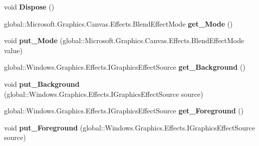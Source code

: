 \begin{DoxyCompactItemize}
\item 
\mbox{\label{class_microsoft_1_1_graphics_1_1_canvas_1_1_effects_1_1_blend_effect_a5d0e95366e1252da3cf90f1d61cd0935}} 
void {\bfseries Dispose} ()
\item 
\mbox{\label{class_microsoft_1_1_graphics_1_1_canvas_1_1_effects_1_1_blend_effect_ab50bbe9eaad5189343a4e0dc8958294a}} 
global\+::\+Microsoft.\+Graphics.\+Canvas.\+Effects.\+Blend\+Effect\+Mode {\bfseries get\+\_\+\+Mode} ()
\item 
\mbox{\label{class_microsoft_1_1_graphics_1_1_canvas_1_1_effects_1_1_blend_effect_ae28d797f3ec0b639d357346a4e2eb258}} 
void {\bfseries put\+\_\+\+Mode} (global\+::\+Microsoft.\+Graphics.\+Canvas.\+Effects.\+Blend\+Effect\+Mode value)
\item 
\mbox{\label{class_microsoft_1_1_graphics_1_1_canvas_1_1_effects_1_1_blend_effect_a8c5401801aebc2069ae548d01680f8a9}} 
global\+::\+Windows.\+Graphics.\+Effects.\+I\+Graphics\+Effect\+Source {\bfseries get\+\_\+\+Background} ()
\item 
\mbox{\label{class_microsoft_1_1_graphics_1_1_canvas_1_1_effects_1_1_blend_effect_abd598b6c76aa0c92ce04d0ec53ec328e}} 
void {\bfseries put\+\_\+\+Background} (global\+::\+Windows.\+Graphics.\+Effects.\+I\+Graphics\+Effect\+Source source)
\item 
\mbox{\label{class_microsoft_1_1_graphics_1_1_canvas_1_1_effects_1_1_blend_effect_a10ccecae64e09d405b1921dc72bcd69d}} 
global\+::\+Windows.\+Graphics.\+Effects.\+I\+Graphics\+Effect\+Source {\bfseries get\+\_\+\+Foreground} ()
\item 
\mbox{\label{class_microsoft_1_1_graphics_1_1_canvas_1_1_effects_1_1_blend_effect_a898a9aa44604170ad7f898b4cc45c084}} 
void {\bfseries put\+\_\+\+Foreground} (global\+::\+Windows.\+Graphics.\+Effects.\+I\+Graphics\+Effect\+Source source)

\end{DoxyCompactItemize}
